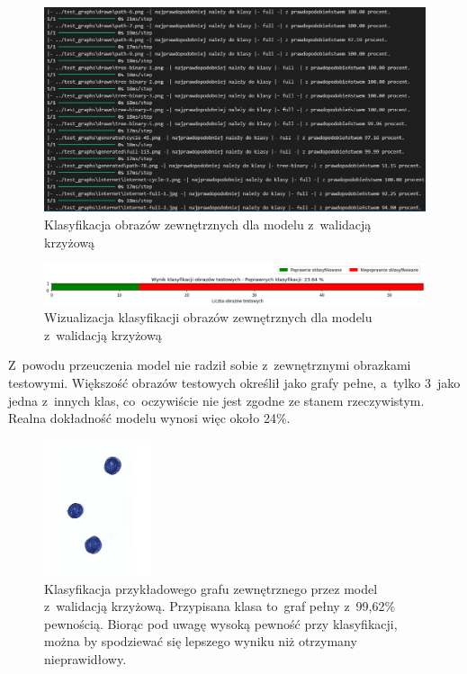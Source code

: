\begin{figure}[ht]
	\centering
	\includegraphics[width=15.5cm]{resources/tests/images/v3/crossvalid_txt.png}
	\caption{Klasyfikacja obrazów zewnętrznych dla modelu z~walidacją krzyżową}
	\label{Fig:tests-cv-0b}
\end{figure}
\FloatBarrier

\begin{figure}[ht]
	\centering
	\includegraphics[width=15.5cm]{resources/tests/images/v3/crossvalid_bar.png}
	\caption{Wizualizacja klasyfikacji obrazów zewnętrznych dla modelu z~walidacją krzyżową}
	\label{Fig:tests-cv-0c}
\end{figure}
\FloatBarrier

Z~powodu przeuczenia model nie radził sobie z~zewnętrznymi obrazkami testowymi.
Większość obrazów testowych określił jako grafy pełne, a~tylko 3~jako jedna z~innych klas,
co~oczywiście nie jest zgodne ze stanem rzeczywistym.
Realna dokładność modelu wynosi więc około 24\%.

\begin{figure}[ht]
	\centering
	\includegraphics[height=4cm]{../graph_classification/test_graphs/drawn/empty-1.png}
	\caption{Klasyfikacja przykładowego grafu zewnętrznego przez model z~walidacją krzyżową.
		Przypisana klasa to~graf pełny z~99,62\% pewnością.
		Biorąc pod uwagę wysoką pewność przy klasyfikacji,
		można by spodziewać się lepszego wyniku niż otrzymany nieprawidłowy.}
	\label{Fig:tests-cv-0d}
\end{figure}
\FloatBarrier

